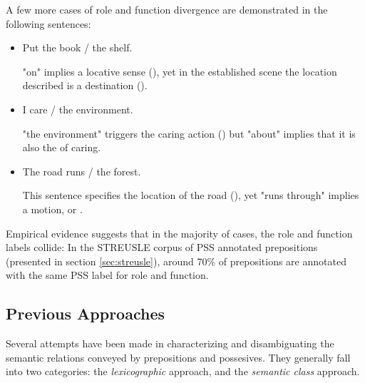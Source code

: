 A few more cases of role and function divergence are demonstrated in the following sentences:

\begin{itemize}
    \item Put the book / the shelf.
          
          "on" implies a locative sense (), yet in the established scene the location described is a destination ().
    \item I care / the environment.
          
          "the environment" triggers the caring action () but "about" implies that it is also the  of caring.
    \item The road runs / the forest.
          
          This sentence specifies the location of the road (), yet "runs through" implies a motion, or .
\end{itemize}

Empirical evidence suggests that in the majority of cases, the role and function labels collide: In the STREUSLE corpus of PSS annotated prepositions (presented in section \ref{sec:streusle}), around 70\% of prepositions are annotated with the same PSS label for role and function. 

\subsection{Previous Approaches}

Several attempts have been made in characterizing and disambiguating the semantic relations conveyed by prepositions and possesives. They generally fall into two categories: the \textit{lexicographic} approach, and the \textit{semantic class} approach. 

